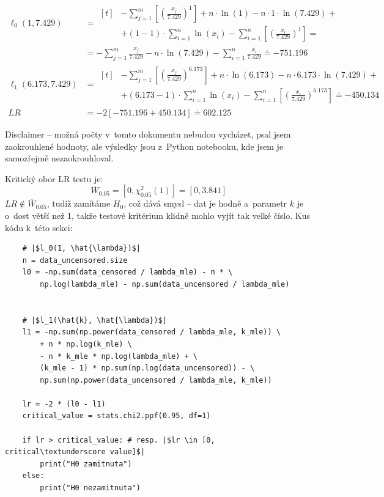 \documentclass[a4paper, 11pt]{article}
\begin{document}
\begin{align*}
    \ell_0(1, 7.429) &= \begin{aligned}[t]
        &-\sum_{j=1}^{m} \left[ \left( \frac{x_j}{7.429} \right)^1 \right] + n \cdot \ln(1) - n \cdot 1 \cdot \ln(7.429) + \\
        &+ (1 - 1) \cdot \sum_{i=1}^{n} \ln(x_i) - \sum_{i=1}^{n} \left[ \left( \frac{x_i}{7.429} \right)^1 \right] =
    \end{aligned} \\
    &= -\sum_{j=1}^{m} \frac{x_j}{7.429} - n \cdot \ln(7.429) -\sum_{i=1}^{n} \frac{x_i}{7.429} \doteq -751.196 \\
    \ell_1(6.173, 7.429) &= \begin{aligned}[t]
        &- \sum_{j=1}^{m} \left[ \left( \frac{x_j}{7.429} \right)^{6.173} \right] + n \cdot \ln(6.173) - n \cdot 6.173 \cdot \ln(7.429) + \\ 
        &+ (6.173 - 1) \cdot \sum_{i=1}^{n} \ln(x_i) - \sum_{i=1}^{n} \left[ \left( \frac{x_i}{7.429} \right)^{6.173} \right] \doteq -450.134
    \end{aligned} \\
    LR &= -2 \left[ -751.196 + 450.134 \right] \doteq 602.125
\end{align*}

Disclaimer -- možná počty v~tomto dokumentu nebudou vycházet, psal jsem zaokrouhlené hodnoty, ale výsledky jsou z~Python notebooku, kde jsem je samozřejmě nezaokrouhloval.

Kritický obor LR testu je:
\[
   \overline{W}_{0.05} = [0, \chi^2_{0.05}(1)] = [0, 3.841]
\]
$LR \notin \overline{W}_{0.05}$, tudíž zamítáme $H_0$, což dává smysl -- dat je hodně a~parametr $k$ je o~dost větší než 1, takže testové kritérium klidně mohlo vyjít tak velké číslo.
Kus kódu k~této sekci:

\begin{verbatim}
    # |$l_0(1, \hat{\lambda})$|
    n = data_uncensored.size
    l0 = -np.sum(data_censored / lambda_mle) - n * \
        np.log(lambda_mle) - np.sum(data_uncensored / lambda_mle)


    # |$l_1(\hat{k}, \hat{\lambda})$|
    l1 = -np.sum(np.power(data_censored / lambda_mle, k_mle)) \ 
        + n * np.log(k_mle) \
        - n * k_mle * np.log(lambda_mle) + \
        (k_mle - 1) * np.sum(np.log(data_uncensored)) - \
        np.sum(np.power(data_uncensored / lambda_mle, k_mle))

    lr = -2 * (l0 - l1)
    critical_value = stats.chi2.ppf(0.95, df=1)

    if lr > critical_value: # resp. |$lr \in [0, critical\textunderscore value]$|
        print("H0 zamitnuta")
    else:
        print("H0 nezamitnuta")
\end{verbatim}
\end{document}

